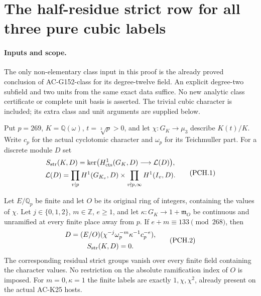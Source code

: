 \section{The half-residue strict row for all three pure cubic labels}
\label{sec:pure-cubic-half-residue-strict}

\paragraph{Inputs and scope.}
The only non-elementary class input in this proof is the already
proved conclusion of AC-G152-class for its degree-twelve field.
An explicit degree-two subfield and two units from the same exact
data suffice.  No new analytic class certificate or complete unit
basis is asserted.  The trivial cubic character is included;
its extra class and unit arguments are supplied below.

Put $p=269$, $K=\mathbb Q(\omega)$, $t=\sqrt[3]p>0$, and let
$\chi:G_K\to\mu_3$ describe $K(t)/K$.
Write $c_p$ for the actual cyclotomic character and $\omega_p$
for its Teichmuller part.  For a discrete module $D$ set
\[
 \begin{gathered}
 S_{\rm str}(K,D)=\ker\bigl(H^1_{\rm cts}(G_K,D)
                                  \longrightarrow\mathcal L(D)\bigr),\\
 \mathcal L(D)=\prod_{v\mid p}H^1(G_{K_v},D)
           \times\prod_{v\nmid p,\infty}H^1(I_v,D).
 \end{gathered}
 \tag{PCH.1}
\]

\begin{theorem}
\label{AC-G154}
Let $E/\mathbb Q_p$ be finite and let $O$ be its original ring of
integers, containing the values of $\chi$.
Let $j\in\{0,1,2\}$, $m\in\mathbb Z$, $e\geq1$, and let
$\kappa:G_K\to1+\mathfrak m_O$ be continuous and unramified at
every finite place away from $p$.
If $e+m\equiv133\pmod{268}$, then
\[
 \begin{gathered}
 D=(E/O)(\chi^{-j}\omega_p^{-m}\kappa^{-1}c_p^{-e}),\\
                         S_{\rm str}(K,D)=0.
 \end{gathered}
 \tag{PCH.2}
\]
The corresponding residual strict groups vanish over every finite
field containing the character values.
No restriction on the absolute ramification index of $O$ is imposed.
For $m=0,\kappa=1$ the finite labels are exactly
$1,\chi,\chi^2$, already present on the actual AC-K25 hosts.
\end{theorem}

